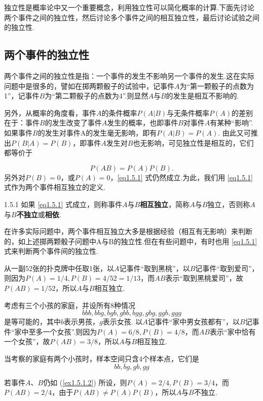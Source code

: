 独立性是概率论中又一个重要概念，利用独立性可以简化概率的计算.下面先讨论两个事件之间的独立性，然后讨论多个事件之间的相互独立性，最后讨论试验之间的独立性.

\subsection{两个事件的独立性}
两个事件之间的独立性是指：一个事件的发生不影响另一个事件的发生.这在实际问题中是很多的，譬如在掷两颗骰子的试验中，记事件$A$为“第一颗骰子的点数为1”，记事件$B$为“第二颗骰子的点数为4”.则显然$A$与$B$的发生是相互不影响的.

另外，从概率的角度看，事件$A$的条件概率$P(A|B)$与无条件概率$P(A)$的差别在于：事件$B$的发生改变了事件$A$发生的概率，也即事件$B$对事件$A$有某种“影响”. 如果事件$B$的发生对事件A的发生毫无影响，即有$P(A|B)=P(A)$. 由此又可推出$P(B|A)=P(B)$，即事件$A$发生对$B$也无影响，可见独立性是相互的，它们都等价于

\begin{equation}\label{eq1.5.1}
  P(AB) = P(A)P(B).
\end{equation}
另外对$P(B)=0$，或$P(A)=0$，\eqref{eq1.5.1} 式仍然成立.为此，我们用 \eqref{eq1.5.1} 式作为两个事件相互独立的定义.

\begin{definition}{}{1.5.1}
  如果 \eqref{eq1.5.1} 式成立，则称事件$A$与$B$\textbf{相互独立}，简称$A$与$B$独立，否则称$A$与$B$\textbf{不独立}或\textbf{相依}.
\end{definition}

在许多实际问题中，两个事件相互独立大多是根据经验（相互有无影响）来判断的，如上述掷两颗骰子问题中A与B的独立性.但在有些问题中，有时也用  \eqref{eq1.5.1} 式来判断两个事件间的独立性.

\begin{example}[事件独立的例子]

  \begin{inparaenum}[(1)]
    \item 从一副52张的扑克牌中任取1张，以$A$记事件“取到黑桃”，以$B$记事件“取到爱司”，则因为$P(A)=1/4,P(B)=4/52=1/13$，而$AB$表示“取到黑桃爱司”，故$P(AB)=1/52$，所以$A$与$B$相互独立.

    \item\label{ex1.5.1.2} 考虑有三个小孩的家庭，并设所有8种情况
      \[
        bbb, bbg, bgb, gbb, bgg, gbg, ggb ,ggg
      \]
      是等可能的，其中$b$表示男孩，$g$表示女孩. 以$A$记事件“家中男女孩都有”，以$B$记事件“家中至多一个女孩”.则因为$P(A)=6/8,P(B)=4/8$，而$AB$表示“家中恰有一个女孩”，故$P(AB)=3/8$，所以$A$与$B$相互独立.

    \item 当考察的家庭有两个小孩时，样本空间只含4个样本点，它们是
      \[
        bb ,bg , gb ,gg
      \]

      若事件$A$、$B$仍如 (\ref{ex1.5.1.2}) 所设，则$P(A)=2/4,P(B)=3/4$，而$P(AB)=2/4$，由于$P(AB)\ne P(A)P(B)$，所以$A$与$B$不独立.
  \end{inparaenum}
\end{example}

